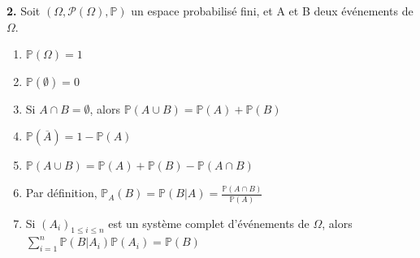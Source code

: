 \documentclass[11pt,a4paper]{article}
\begin{document}
\noindent \textbf{2.} Soit $(\Omega, \mathcal{P}(\Omega), \mathbb{P})$ un espace probabilisé fini, et A et B deux événements de $\Omega$.
\begin{enumerate}
    \item[(a)] $\mathbb{P}(\Omega) = 1$
    
    \item[(b)] $\mathbb{P}(\emptyset) = 0$
    
    \item[(c)] Si $A \cap B = \emptyset$, alors $\mathbb{P}(A \cup B) = \mathbb{P}(A) + \mathbb{P}(B)$
    
    \item[(d)] $\mathbb{P}(\overline{A}) = 1 - \mathbb{P}(A)$
    
    \item[(e)] $\mathbb{P}(A \cup B) = \mathbb{P}(A) + \mathbb{P}(B) - \mathbb{P}(A \cap B)$
    
    \item[(f)] Par définition, $\mathbb{P}_A(B) = \mathbb{P}(B|A) = \frac{\mathbb{P}(A \cap B)}{\mathbb{P}(A)}$
    
    \item[(g)] Si $(A_i)_{1\le i\le n}$ est un système complet d'événements de $\Omega$, alors $\sum_{i=1}^{n}\mathbb{P}(B|A_i)\mathbb{P}(A_i) = \mathbb{P}(B)$
\end{enumerate}
\end{document}
